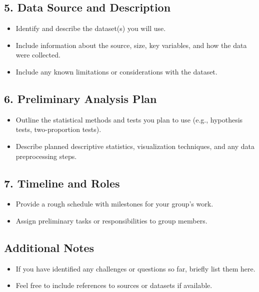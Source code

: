 \documentclass[12pt]{article}
\begin{document}
\subsection*{5. Data Source and Description}
\begin{itemize}
    \item Identify and describe the dataset(s) you will use. 
    \item Include information about the source, size, key variables, and how the data were collected.
    \item Include any known limitations or considerations with the dataset.
\end{itemize}

\subsection*{6. Preliminary Analysis Plan}
\begin{itemize}
    \item Outline the statistical methods and tests you plan to use (e.g., hypothesis tests, two-proportion tests).  
    \item Describe planned descriptive statistics, visualization techniques, and any data preprocessing steps.
\end{itemize}

\subsection*{7. Timeline and Roles}
\begin{itemize}
    \item Provide a rough schedule with milestones for your group’s work.  
    \item Assign preliminary tasks or responsibilities to group members.
\end{itemize}

\subsection*{Additional Notes}
\begin{itemize}
    \item If you have identified any challenges or questions so far, briefly list them here.
    \item Feel free to include references to sources or datasets if available.
\end{itemize}
\end{document}
